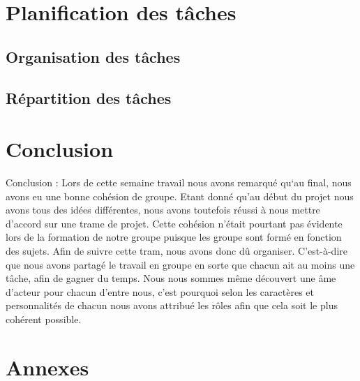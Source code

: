 \documentclass[a4paper,10pt]{article} %
\begin{document}
\section{Planification des tâches}

	\subsection{Organisation des tâches}

	\subsection{Répartition des tâches}



\section*{Conclusion}
Conclusion :
        Lors de cette semaine travail nous avons remarqué qu‘au final, nous avons eu une bonne cohésion de groupe. Etant donné qu’au début du projet nous avons tous des idées différentes, nous avons toutefois réussi à nous mettre d’accord sur une trame de projet. Cette cohésion n’était pourtant pas évidente lors de la formation de notre groupe puisque les groupe sont formé en fonction des sujets. Afin de suivre cette tram, nous avons donc dû organiser. C’est-à-dire que nous avons partagé le travail en groupe en sorte que chacun ait au moins une tâche, afin de gagner du temps. Nous nous sommes même découvert une âme d’acteur pour chacun d’entre nous, c’est pourquoi selon les caractères et personnalités de chacun nous avons attribué les rôles afin que cela soit le plus cohérent possible.
\section*{Annexes}
\end{document}
